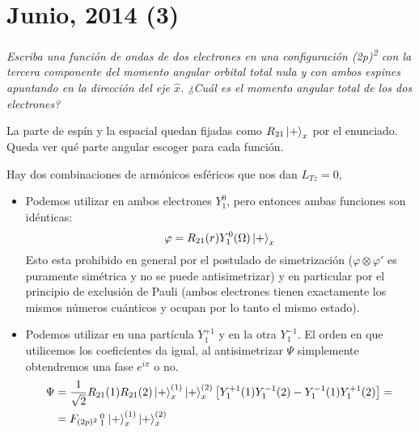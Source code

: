 \chapter{Junio, 2014 (3)}
\begin{tcolorbox}[halign=left]
  \emph{Escriba una función de ondas de dos electrones en una
    configuración (2p)\textsuperscript{2} con la tercera componente
    del momento angular orbital total nula y con ambos espines
    apuntando en la dirección del eje $\hat{x}$. ¿Cuál es el momento
    angular total de los dos electrones?}
\end{tcolorbox}

La parte de espín y la espacial quedan fijadas como $R_{21}\ket{+}_x$
por el enunciado. Queda ver qué parte angular escoger para cada función.

Hay dos combinaciones de armónicos esféricos que nos dan ${L_{Tz}=0}$,
\begin{itemize}
\item Podemos utilizar en ambos electrones $Y_1^0$, pero entonces
  ambas funciones son idénticas:
  \begin{equation}
    \varphi = R_{21}(r)Y_1^0(\Omega)\ket{+}_x
  \end{equation}
  Esto esta prohibido en general por el postulado de simetrización
  ($\varphi\otimes\varphi'$ es puramente simétrica y no se puede
  antisimetrizar) y en particular por el principio de exclusión de
  Pauli (ambos electrones tienen exactamente los mismos números
  cuánticos y ocupan por lo tanto el mismo estado).
\item Podemos utilizar en una partícula $Y_1^{+1}$ y en la otra
  $Y_1^{-1}$. El orden en que utilicemos los coeficientes da igual, al
  antisimetrizar $\Psi$ simplemente obtendremos una fase $e^{i\pi}$ o
  no.
  \begin{equation}
    \begin{split}
      \Psi &=
      \frac{1}{\sqrt{2}}R_{21}(1)R_{21}(2)\ket{+}_x^{(1)}\ket{+}_x^{(2)}
      \left[ Y_1^{+1}(1)  Y_1^{-1}(2) - Y_1^{-1}(1)Y_1^{+1}(2)
        \right] = \\
        &=F_{(2p)^2} \smqty{0\\ 1} \ket{+}_x^{(1)}\ket{+}_x^{(2)}
      \end{split}
  \end{equation}
\end{itemize}

